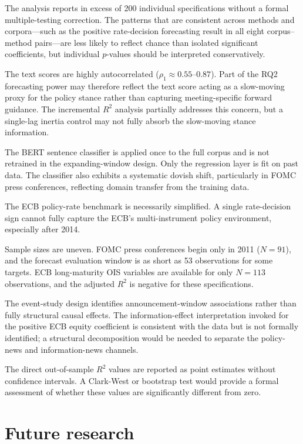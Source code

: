 The analysis reports in excess of 200 individual specifications without a formal
multiple-testing correction. The patterns that are consistent across methods and
corpora---such as the positive rate-decision forecasting result in all eight
corpus--method pairs---are less likely to reflect chance than isolated significant
coefficients, but individual $p$-values should be interpreted conservatively.

The text scores are highly autocorrelated ($\rho_1 \approx 0.55$--$0.87$). Part
of the RQ2 forecasting power may therefore reflect the text score acting as a
slow-moving proxy for the policy stance rather than capturing meeting-specific
forward guidance. The incremental $R^2$ analysis partially addresses this
concern, but a single-lag inertia control may not fully absorb the slow-moving
stance information.

The BERT sentence classifier is applied once to the full corpus and is
not retrained in the expanding-window design. Only the regression layer is fit
on past data. The classifier also exhibits a systematic dovish shift,
particularly in FOMC press conferences, reflecting domain transfer from the
training data.

The ECB policy-rate benchmark is necessarily simplified. A single rate-decision
sign cannot fully capture the ECB's multi-instrument policy environment,
especially after 2014.

Sample sizes are uneven. FOMC press conferences begin only in 2011 ($N=91$),
and the forecast evaluation window is as short as 53 observations for some
targets. ECB long-maturity OIS variables are available for only $N=113$
observations, and the adjusted $R^2$ is negative for these specifications.

The event-study design identifies announcement-window associations rather than
fully structural causal effects. The information-effect interpretation invoked
for the positive ECB equity coefficient is consistent with the data but is not
formally identified; a structural decomposition would be needed to separate the
policy-news and information-news channels.

The direct out-of-sample $R^2$ values are reported as point estimates without
confidence intervals. A Clark-West or bootstrap test would provide a formal
assessment of whether these values are significantly different from zero.

\section{Future research}
\label{sec:conc_future}

